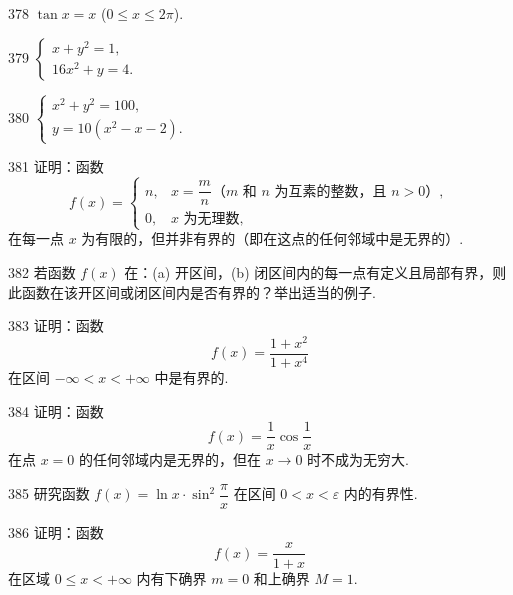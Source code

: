 \begin{prob}[S]{378}
$\tan x = x$ ($0 \leqslant x \leqslant 2\pi$).
\end{prob}


\begin{prob}[S]{379}
$\begin{cases} x + y^2 = 1, \\ 16x^2 + y = 4. \end{cases}$
\end{prob}

\begin{prob}[S]{380}
$\begin{cases} x^2 + y^2 = 100, \\ y = 10(x^2 - x - 2). \end{cases}$
\end{prob}


\begin{prob}[M]{381}
证明：函数
\[
f(x) = \begin{cases}
n, & x = \dfrac{m}{n} \text{（$m$ 和 $n$ 为互素的整数，且 $n > 0$）}, \\
0, & x \text{ 为无理数},
\end{cases}
\]
在每一点 $x$ 为有限的，但并非有界的（即在这点的任何邻域中是无界的）.
\end{prob}

\begin{prob}[M]{382}
若函数 $f(x)$ 在：(a) 开区间，(b) 闭区间内的每一点有定义且局部有界，则此函数在该开区间或闭区间内是否有界的？举出适当的例子.
\end{prob}

\begin{prob}[M]{383}
证明：函数
\[
f(x) = \frac{1 + x^2}{1 + x^4}
\]
在区间 $-\infty < x < +\infty$ 中是有界的.
\end{prob}

\begin{prob}[M]{384}
证明：函数
\[
f(x) = \frac{1}{x} \cos \frac{1}{x}
\]
在点 $x = 0$ 的任何邻域内是无界的，但在 $x \to 0$ 时不成为无穷大.
\end{prob}

\begin{prob}[M]{385}
研究函数 $f(x) = \ln x \cdot \sin^2 \dfrac{\pi}{x}$ 在区间 $0 < x < \varepsilon$ 内的有界性.
\end{prob}

\begin{prob}[M]{386}
证明：函数
\[
f(x) = \frac{x}{1 + x}
\]
在区域 $0 \leqslant x < +\infty$ 内有下确界 $m = 0$ 和上确界 $M = 1$.
\end{prob}

